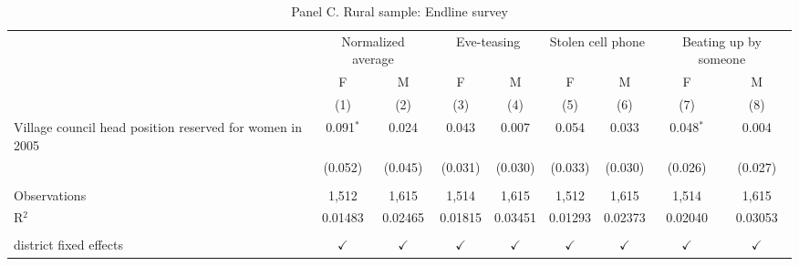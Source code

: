 \begin{table}[htbp]
   \caption{Panel C. Rural sample: Endline survey}
   \bigskip
   \centering
   \begin{tabular}{lcccccccc}
      \toprule
       & \multicolumn{2}{c}{Normalized average} & \multicolumn{2}{c}{Eve-teasing} & \multicolumn{2}{c}{Stolen cell phone} & \multicolumn{2}{c}{Beating up by someone}\\
                                                                & F             & M             & F             & M             & F             & M             & F             & M \\   
                                                                & (1)           & (2)           & (3)           & (4)           & (5)           & (6)           & (7)           & (8)\\  
      \midrule 
       Village council head position reserved for women in 2005 & 0.091$^{*}$   & 0.024         & 0.043         & 0.007         & 0.054         & 0.033         & 0.048$^{*}$   & 0.004\\   
                                                                & (0.052)       & (0.045)       & (0.031)       & (0.030)       & (0.033)       & (0.030)       & (0.026)       & (0.027)\\   
       \\
      Observations                                              & 1,512         & 1,615         & 1,514         & 1,615         & 1,512         & 1,615         & 1,514         & 1,615\\  
      R$^2$                                                     & 0.01483       & 0.02465       & 0.01815       & 0.03451       & 0.01293       & 0.02373       & 0.02040       & 0.03053\\  
       \\
      district fixed effects                                    & $\checkmark$  & $\checkmark$  & $\checkmark$  & $\checkmark$  & $\checkmark$  & $\checkmark$  & $\checkmark$  & $\checkmark$\\   
      \bottomrule
   \end{tabular}
\end{table}


